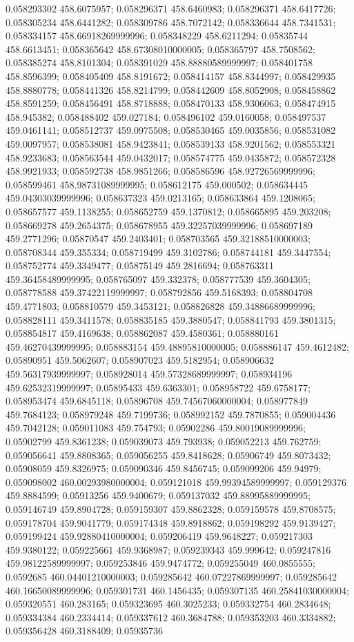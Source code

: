 0.058293302 458.6075957; 0.058296371 458.6460983; 0.058296371 458.6417726; 0.058305234 458.6441282; 0.058309786 458.7072142; 0.058336644 458.7341531; 0.058334157 458.66918269999996; 0.058348229 458.6211294; 0.05835744 458.6613451; 0.058365642 458.67308010000005; 0.058365797 458.7508562; 0.058385274 458.8101304; 0.058391029 458.88880589999997; 0.058401758 458.8596399; 0.058405409 458.8191672; 0.058414157 458.8344997; 0.058429935 458.8880778; 0.058441326 458.8214799; 0.058442609 458.8052908; 0.058458862 458.8591259; 0.058456491 458.8718888; 0.058470133 458.9306063; 0.058474915 458.945382; 0.058488402 459.027184; 0.058496102 459.0160058; 0.058497537 459.0461141; 0.058512737 459.0975508; 0.058530465 459.0035856; 0.058531082 459.0097957; 0.058538081 458.9423841; 0.058539133 458.9201562; 0.058553321 458.9233683; 0.058563544 459.0432017; 0.058574775 459.0435872; 0.058572328 458.9921933; 0.058592738 458.9851266; 0.058586596 458.92726569999996; 0.058599461 458.98731089999995; 0.058612175 459.000502; 0.058634445 459.04303039999996; 0.058637323 459.0213165; 0.058633864 459.1208065; 0.058657577 459.1138255; 0.058652759 459.1370812; 0.058665895 459.203208; 0.058669278 459.2654375; 0.058678955 459.32257039999996; 0.058697189 459.2771296; 0.05870547 459.2403401; 0.058703565 459.32188510000003; 0.058708344 459.355334; 0.058719499 459.3102786; 0.058744181 459.3447554; 0.058752774 459.3349477; 0.05875149 459.2816694; 0.058763311 459.36458489999995; 0.058765097 459.332378; 0.058777539 459.3604305; 0.058778588 459.37422119999997; 0.058792856 459.5168393; 0.058804708 459.4771803; 0.058810579 459.3453121; 0.058826828 459.34886689999996; 0.058828111 459.3411578; 0.058835185 459.3880547; 0.058841793 459.3801315; 0.058854817 459.4169638; 0.058862087 459.4580361; 0.058880161 459.46270439999995; 0.058883154 459.48895810000005; 0.058886147 459.4612482; 0.05890951 459.5062607; 0.058907023 459.5182954; 0.058906632 459.56317939999997; 0.058928014 459.57328689999997; 0.058934196 459.62532319999997; 0.05895433 459.6363301; 0.058958722 459.6758177; 0.058953474 459.6845118; 0.05896708 459.74567060000004; 0.058977849 459.7684123; 0.058979248 459.7199736; 0.058992152 459.7870855; 0.059004436 459.7042128; 0.059011083 459.754793; 0.05902286 459.80019089999996; 0.05902799 459.8361238; 0.059039073 459.793938; 0.059052213 459.762759; 0.059056641 459.8808365; 0.059056255 459.8418628; 0.05906749 459.8073432; 0.05908059 459.8326975; 0.059090346 459.8456745; 0.059099206 459.94979; 0.059098002 460.00293980000004; 0.059121018 459.99394589999997; 0.059129376 459.8884599; 0.05913256 459.9400679; 0.059137032 459.88995889999995; 0.059146749 459.8904728; 0.059159307 459.8862328; 0.059159578 459.8708575; 0.059178704 459.9041779; 0.059174348 459.8918862; 0.059198292 459.9139427; 0.059199424 459.92880410000004; 0.059206419 459.9648227; 0.059217303 459.9380122; 0.059225661 459.9368987; 0.059239343 459.999642; 0.059247816 459.98122589999997; 0.059253846 459.9474772; 0.059255049 460.0855555; 0.0592685 460.04401210000003; 0.059285642 460.07227869999997; 0.059285642 460.16650089999996; 0.059301731 460.1456435; 0.059307135 460.25841030000004; 0.059320551 460.283165; 0.059323695 460.3025233; 0.059332754 460.2834648; 0.059334384 460.2334414; 0.059337612 460.3684788; 0.059353203 460.3334882; 0.059356428 460.3188409; 0.05935736 